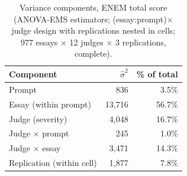 \begin{table}[t]\centering\caption{Variance components, ENEM total score (ANOVA-EMS estimators; (essay:prompt)$\times$judge design with replications nested in cells; 977 essays $\times$ 12 judges $\times$ 3 replications, complete).}
\label{tab:gtheory}\small\begin{tabular}{lrr}\toprule
Component & $\hat\sigma^2$ & \% of total \\ \midrule
Prompt & 836 & 3.5\% \\
Essay (within prompt) & 13,716 & 56.7\% \\
Judge (severity) & 4,048 & 16.7\% \\
Judge $\times$ prompt & 245 & 1.0\% \\
Judge $\times$ essay & 3,471 & 14.3\% \\
Replication (within cell) & 1,877 & 7.8\% \\
\bottomrule\end{tabular}\end{table}
